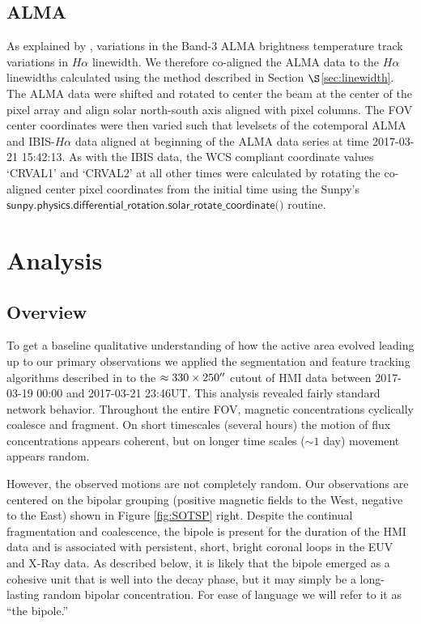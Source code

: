 \documentclass[twocolumn]{aastex62}
\newcommand{\code}[1]{\ensuremath{\textsf{#1}}}
\newcommand{\secref}[1]{$\S$\ref{#1}}
\newcommand{\halpha}{\ensuremath{H\alpha}}
\begin{document}
\subsection{ALMA}\label{sec:almaalign}
As explained by \citet{2019Molnar}, variations in the Band-3 ALMA brightness temperature track variations in \halpha{} linewidth.
We therefore co-aligned the ALMA data to the \halpha{} linewidths calculated using the method described in Section \secref{sec:linewidth}.
The ALMA data were shifted and rotated to center the beam at the center of the pixel array and align solar north-south axis aligned with pixel columns.  
The FOV center coordinates were then varied such that levelsets of the cotemporal ALMA and IBIS-\halpha{} data aligned at beginning of the ALMA data series at time 2017-03-21 15:42:13.  
As with the IBIS data, the WCS compliant coordinate values `CRVAL1' and `CRVAL2' at all other times were calculated by rotating the co-aligned center pixel coordinates from the initial time using the Sunpy's \code{sunpy.physics.differential\_rotation.solar\_rotate\_coordinate()} routine.


\section{Analysis}\label{sec:analysis}
\subsection{Overview}
To get a baseline qualitative understanding of how the active area evolved leading up to our primary observations we applied the segmentation and feature tracking algorithms described in \citet{2012Tarr} to the $\approx330\times250\mbox{$^{\prime\prime}$}{}$ cutout of HMI data between 2017-03-19 00:00 and 2017-03-21 23:46UT.  
This analysis revealed fairly standard network behavior.
Throughout the entire FOV, magnetic concentrations cyclically coalesce and fragment.
On short timescales (several hours) the motion of flux concentrations appears coherent, but on longer time scales ($\sim1$ day) movement appears random.   

However, the observed motions are not completely random.
Our observations are centered on the bipolar grouping (positive magnetic fields to the West, negative to the East) shown in Figure \ref{fig:SOTSP} right.
Despite the continual fragmentation and coalescence, the bipole is present for the duration of the HMI data and is associated with persistent, short, bright coronal loops in the EUV and X-Ray data.
As described below, it is likely that the bipole emerged as a cohesive unit that is well into the decay phase, but it may simply be a long-lasting random bipolar concentration. 
For ease of language we will refer to it as ``the bipole.''
\end{document}
